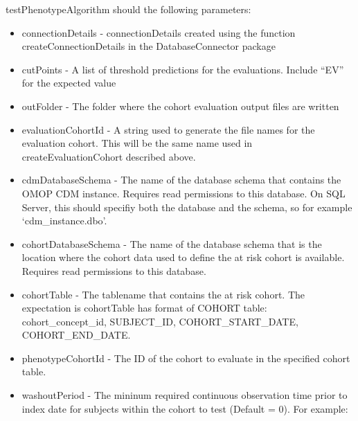 \documentclass[
]{article}
\providecommand{\tightlist}{%
  \setlength{\itemsep}{0pt}\setlength{\parskip}{0pt}}
\begin{document}
testPhenotypeAlgorithm should the following parameters:

\begin{itemize}
\tightlist
\item
  connectionDetails - connectionDetails created using the function
  createConnectionDetails in the DatabaseConnector package
\item
  cutPoints - A list of threshold predictions for the evaluations.
  Include ``EV'' for the expected value
\item
  outFolder - The folder where the cohort evaluation output files are
  written
\item
  evaluationCohortId - A string used to generate the file names for the
  evaluation cohort. This will be the same name used in
  createEvaluationCohort described above.
\item
  cdmDatabaseSchema - The name of the database schema that contains the
  OMOP CDM instance. Requires read permissions to this database. On SQL
  Server, this should specifiy both the database and the schema, so for
  example `cdm\_instance.dbo'.
\item
  cohortDatabaseSchema - The name of the database schema that is the
  location where the cohort data used to define the at risk cohort is
  available. Requires read permissions to this database.
\item
  cohortTable - The tablename that contains the at risk cohort. The
  expectation is cohortTable has format of COHORT table:
  cohort\_concept\_id, SUBJECT\_ID, COHORT\_START\_DATE,
  COHORT\_END\_DATE.
\item
  phenotypeCohortId - The ID of the cohort to evaluate in the specified
  cohort table.
\item
  washoutPeriod - The mininum required continuous observation time prior
  to index date for subjects within the cohort to test (Default = 0).
  For example:
\end{itemize}
\end{document}

